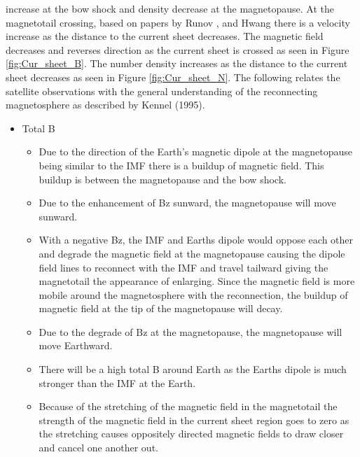 increase at the bow shock and density decrease at the magnetopause.
At the magnetotail crossing, based on papers by Runov \cite{Runov2006}, and
Hwang \cite{Hwang2013} there is a velocity increase as the distance to the
current sheet decreases. The magnetic field decreases and reverses direction as the current
sheet is crossed as seen in Figure \ref{fig:Cur_sheet_B}. The number density
increases as the distance to the current sheet decreases as seen in Figure
\ref{fig:Cur_sheet_N}.
The following relates the satellite observations with the general understanding
of the reconnecting magnetosphere as described by Kennel (1995).
\begin{itemize}
	\item Total B
	\begin{itemize}
		\item Due to the direction of the Earth's magnetic dipole at the magnetopause
		being similar to the IMF there is a buildup of magnetic field. This buildup is
		between the magnetopause and the bow shock.
		\item Due to the enhancement of Bz sunward, the magnetopause will
		move sunward.
		\item With a negative Bz, the IMF and Earths dipole would oppose each
		other and degrade the magnetic field at the magnetopause causing the dipole
		field lines to reconnect with the IMF and travel tailward giving the
		magnetotail the appearance of enlarging. Since the magnetic field is more
		mobile around the magnetosphere with the reconnection, the buildup of magnetic
		field at the tip of the magnetopause will decay.
		\item Due to the degrade of Bz at the magnetopause, the magnetopause will
		move Earthward.
		\item There will be a high total B around Earth as the Earths dipole is
		much stronger than the IMF at the Earth.
		\item Because of the stretching of the magnetic field in the magnetotail the
		strength of the magnetic field in the current sheet region goes to zero as
		the stretching causes oppositely directed magnetic fields to draw closer and
		cancel one another out.
	\end{itemize}
	

\end{itemize}
